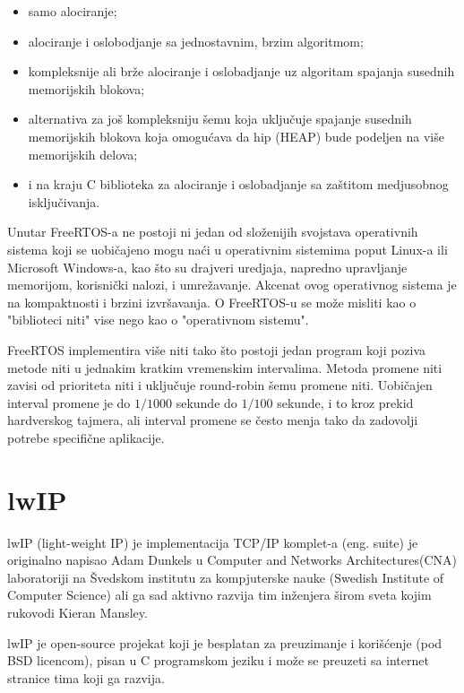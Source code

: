 \documentclass[a4paper,12pt, master]{etf}
\begin{document}
	\begin{itemize}
		\item samo alociranje;
		\item alociranje i oslobodjanje sa jednostavnim, brzim algoritmom;
		\item kompleksnije ali br\v{z}e alociranje i oslobadjanje uz algoritam
            spajanja susednih memorijskih blokova;
		\item alternativa za jo\v{s} kompleksniju \v{s}emu koja uklju\v{c}uje
		    spajanje susednih memorijskih blokova koja omogu\'{c}ava da hip
            (HEAP) bude podeljen na vi\v{s}e memorijskih delova;
		\item i na kraju C biblioteka za alociranje i oslobadjanje sa
    		za\v{s}titom medjusobnog isklju\v{c}ivanja.
	\end{itemize}

	Unutar FreeRTOS-a ne postoji ni jedan od slo\v{z}enijih svojstava
	operativnih sistema koji se	uobi\v{c}ajeno mogu na\'{c}i u operativnim
	sistemima poput Linux-a ili Microsoft Windows-a, kao \v{s}to su drajveri
	uredjaja, napredno upravljanje memorijom, korisni\v{c}ki nalozi, i
	umre\v{z}avanje. Akcenat ovog operativnog sistema je na kompaktnosti i
	brzini izvr\v{s}avanja. O FreeRTOS-u se mo\v{z}e misliti kao o "biblioteci
	niti" vise nego kao o "operativnom sistemu".

	FreeRTOS implementira vi\v{s}e niti tako \v{s}to postoji jedan program koji
	poziva metode niti u jednakim kratkim vremenskim intervalima. Metoda
	promene niti zavisi od prioriteta niti i uklju\v{c}uje round-robin \v{s}emu
	promene niti. Uobi\v{c}ajen interval promene je do $1/1000$ sekunde
	do $1/100$ sekunde, i to kroz prekid hardverskog tajmera, ali interval
	promene se \v{c}esto menja tako da zadovolji potrebe specifi\v{c}ne
	aplikacije.

	\section{lwIP}

	lwIP (light-weight IP) je implementacija TCP/IP komplet-a (eng\@. suite) je
    originalno napisao Adam Dunkels u Computer and Networks Architectures(CNA)
    laboratoriji na \v{S}vedskom institutu za kompjuterske nauke (Swedish
    Institute of Computer Science) ali ga sad aktivno razvija tim in\v{z}enjera
    \v{s}irom sveta kojim rukovodi Kieran Mansley\@.

	lwIP je open-source projekat koji je besplatan za preuzimanje i
	kori\v{s}\'{c}enje (pod BSD	licencom), pisan u C programskom jeziku i
	mo\v{z}e se preuzeti sa internet stranice tima koji	ga razvija.
\end{document}

